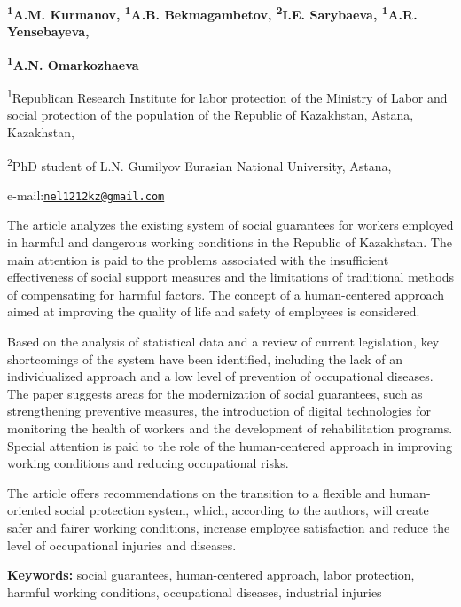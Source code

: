 {\bfseries \textsuperscript{1}A.M. Kurmanov, \textsuperscript{1}A.B.
Bekmagambetov, \textsuperscript{2}I.E. Sarybaeva,
\textsuperscript{1}A.R. Yensebayeva\textsuperscript{\envelope },}

{\bfseries \textsuperscript{1}A.N. Omarkozhaeva}

\textsuperscript{1}Republican Research Institute for labor protection of
the Ministry of Labor and social protection of the population of the
Republic of Kazakhstan, Astana, Kazakhstan,

\textsuperscript{2}PhD student of L.N. Gumilyov Eurasian National
University, Astana,

e-mail:\href{mailto:nel1212kz@gmail.com}{\nolinkurl{nel1212kz@gmail.com}}

The article analyzes the existing system of social guarantees for
workers employed in harmful and dangerous working conditions in the
Republic of Kazakhstan. The main attention is paid to the problems
associated with the insufficient effectiveness of social support
measures and the limitations of traditional methods of compensating for
harmful factors. The concept of a human-centered approach aimed at
improving the quality of life and safety of employees is considered.

Based on the analysis of statistical data and a review of current
legislation, key shortcomings of the system have been identified,
including the lack of an individualized approach and a low level of
prevention of occupational diseases. The paper suggests areas for the
modernization of social guarantees, such as strengthening preventive
measures, the introduction of digital technologies for monitoring the
health of workers and the development of rehabilitation programs.
Special attention is paid to the role of the human-centered approach in
improving working conditions and reducing occupational risks.

The article offers recommendations on the transition to a flexible and
human-oriented social protection system, which, according to the
authors, will create safer and fairer working conditions, increase
employee satisfaction and reduce the level of occupational injuries and
diseases.

{\bfseries Keywords:} social guarantees, human-centered approach, labor
protection, harmful working conditions, occupational diseases,
industrial injuries

